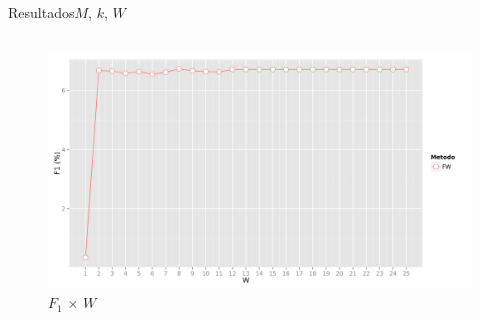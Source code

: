 \begin{frame}{Resultados}{$M$, $k$, $W$}
\begin{columns}[b]
\begin{figure}[ht]
    \begin{center}
    \includegraphics[width=1.1\textwidth]{../img/F1_W}
    \end{center}
    \caption{$F_1$ $\times$ $W$}
    \label{fig:F1_W}
\end{figure}
\end{columns}
\end{frame}



